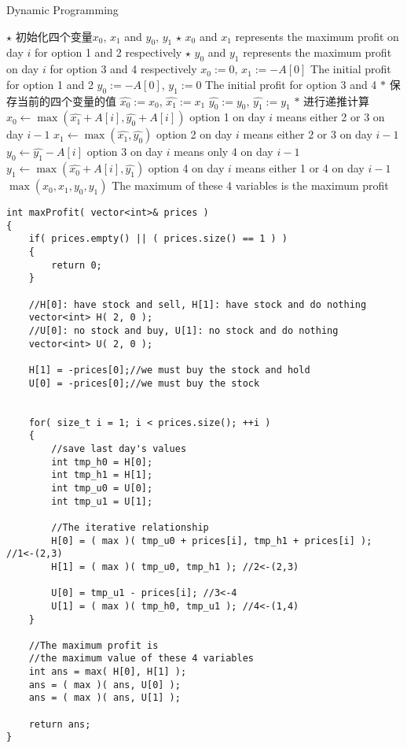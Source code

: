 \begin{algorithm}[H]
\caption{Dynamic Programming}
\begin{algorithmic}[1]
\State $\star$ 初始化四个变量$x_0$, $ x_1 $ and $ y_0 $, $ y_1 $
\State $\star$ $ x_0 $ and $ x_1 $ represents the maximum profit on day $ i $ for option 1 and 2 respectively
\State $\star$ $ y_0 $ and $ y_1 $ represents the maximum profit on day $ i $ for option 3 and 4 respectively
\State $x_0:=0$, \quad $x_1:=-A[0]$ \Comment The initial profit for option 1 and 2
\State $y_0:=-A[0]$, \quad $y_1:=0$ \Comment The initial profit for option 3 and 4
\State $\ast$ 保存当前的四个变量的值
\State $\hat{x_0}:=x_0$, \quad $\hat{x_1}:=x_1$
\State $\hat{y_0}:=y_0$, \quad $\hat{y_1}:=y_1$
\State $\ast$ 进行递推计算
\State $x_0\gets \max(\hat{x_1} + A[i], \hat{y_0} + A[i])$ \Comment option 1 on day $ i $ means either 2 or 3 on day $ i-1 $
\State $x_1\gets \max(\hat{x_1}, \hat{y_0})$ \Comment option 2 on day $ i $ means either 2 or 3 on day $ i-1 $
\State $y_0\gets \hat{y_1} - A[i]$ \Comment option 3 on day $ i $ means only 4 on day $ i-1 $
\State $y_1\gets \max(\hat{x_0} + A[i], \hat{y_1})$ \Comment option 4 on day $ i $ means either 1 or 4 on day $ i-1 $
\EndFor
\State \Return $ \max(x_0, x_1, y_0, y_1) $ \Comment The maximum of these 4 variables is the maximum profit
\EndProcedure
\end{algorithmic}
\end{algorithm}
\setcounter{lstlisting}{0}
\begin{lstlisting}[style=customc, caption={Dynamic Programming}]
int maxProfit( vector<int>& prices )
{
    if( prices.empty() || ( prices.size() == 1 ) )
    {
        return 0;
    }

    //H[0]: have stock and sell, H[1]: have stock and do nothing
    vector<int> H( 2, 0 );
    //U[0]: no stock and buy, U[1]: no stock and do nothing
    vector<int> U( 2, 0 );

    H[1] = -prices[0];//we must buy the stock and hold
    U[0] = -prices[0];//we must buy the stock


    for( size_t i = 1; i < prices.size(); ++i )
    {
        //save last day's values
        int tmp_h0 = H[0];
        int tmp_h1 = H[1];
        int tmp_u0 = U[0];
        int tmp_u1 = U[1];

        //The iterative relationship
        H[0] = ( max )( tmp_u0 + prices[i], tmp_h1 + prices[i] ); //1<-(2,3)
        H[1] = ( max )( tmp_u0, tmp_h1 ); //2<-(2,3)

        U[0] = tmp_u1 - prices[i]; //3<-4
        U[1] = ( max )( tmp_h0, tmp_u1 ); //4<-(1,4)
    }

    //The maximum profit is
    //the maximum value of these 4 variables
    int ans = max( H[0], H[1] );
    ans = ( max )( ans, U[0] );
    ans = ( max )( ans, U[1] );

    return ans;
}
\end{lstlisting}